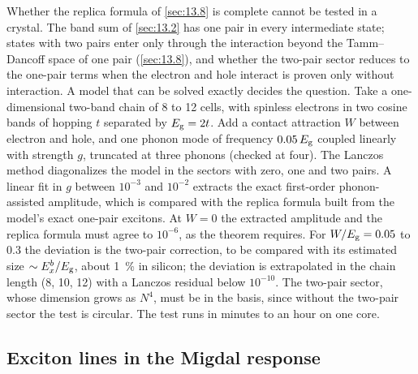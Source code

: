 Whether the replica formula of \cref{sec:13.8} is complete cannot be tested in a crystal. The band sum of \cref{sec:13.2} has one pair in every intermediate state; states with two pairs enter only through the interaction beyond the Tamm--Dancoff space of one pair (\cref{sec:13.8}), and whether the two-pair sector reduces to the one-pair terms when the electron and hole interact is proven only without interaction. A model that can be solved exactly decides the question. Take a one-dimensional two-band chain of 8 to 12 cells, with spinless electrons in two cosine bands of hopping $t$ separated by $E_{\mathrm{g}} = 2t$. Add a contact attraction $W$ between electron and hole, and one phonon mode of frequency $0.05\,E_{\mathrm{g}}$ coupled linearly with strength $g$, truncated at three phonons (checked at four). The Lanczos method diagonalizes the model in the sectors with zero, one and two pairs. A linear fit in $g$ between $10^{-3}$ and $10^{-2}$ extracts the exact first-order phonon-assisted amplitude, which is compared with the replica formula built from the model's exact one-pair excitons. At $W = 0$ the extracted amplitude and the replica formula must agree to $10^{-6}$, as the theorem requires. For $W/E_{\mathrm{g}} = 0.05$ to 0.3 the deviation is the two-pair correction, to be compared with its estimated size $\sim E_x^b/E_{\mathrm{g}}$, about \SI{1}{\percent} in silicon; the deviation is extrapolated in the chain length (8, 10, 12) with a Lanczos residual below $10^{-10}$. The two-pair sector, whose dimension grows as $N^4$, must be in the basis, since without the two-pair sector the test is circular. The test runs in minutes to an hour on one core.

\subsection{Exciton lines in the Migdal response}


